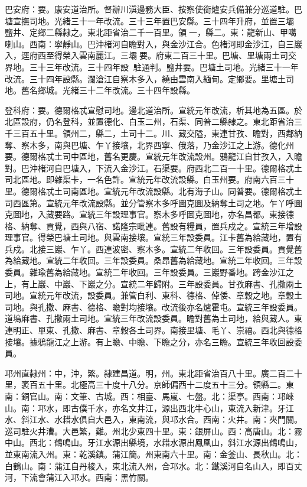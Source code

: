 \begin{pinyinscope}
巴安府：要。康安道治所。督辦川滇邊務大臣、按察使銜爐安兵備兼分巡道駐。巴塘宣撫司地。光緒三十一年改流。三十三年置巴安縣。三十四年升府，並置三壩，鹽井、定鄉二縣隸之。東北距省治二千一百里。領一，縣二。東：龍新山、甲噶喇山。西南：寧靜山。巴沖楮河自瞻對入，與金沙江合。色楮河即金沙江，自三巖入，逕府西至得榮入雲南麗江。三壩要。府東二百三十里。巴塘、里塘兩土司交界地。三十三年改流。三十四年設，駐通判。鹽井要。巴塘土司地。光緒三十一年改流。三十四年設縣。瀾滄江自察木多入，繞由雲南入緬甸。定鄉要。里塘土司地。舊名鄉城。光緒三十二年改流。三十四年設縣。

登科府：要。德爾格忒宣慰司地。邊北道治所。宣統元年改流，析其地為五區。於北區設府，仍名登科，並置德化、白玉二州，石渠、同普二縣隸之。東北距省治三千三百五十里。領州二，縣二，土司十二。川、藏交隘，東連甘孜、瞻對，西鄰納奪、察木多，南與巴塘、乍丫接壤，北界西寧、俄落，乃金沙江之上游。德化州要。德爾格忒土司中區地，舊名更慶。宣統元年改流設州。鴉龍江自甘孜入，入瞻對。巴沖楮河自巴塘入，下流入金沙江。石渠要。府西北二百一十里。德爾格忒土司北區地。即雜渠卡，一名色許。宣統元年改流設縣。白玉州要。府南六百三十里。德爾格忒土司南區地。宣統元年改流設縣。北有海子山。同普要。德爾格忒土司西區第。宣統元年改流設縣。並分管察木多呼圖克圖及納奪土司之地。乍丫呼圖克圖地，入藏要路。宣統三年設理事官。察木多呼圖克圖地，亦名昌都。東接德格、納奪、貢覺，西與八宿、諾隆宗毗連。舊設有糧員，置兵戍之。宣統三年增設理事官。得榮巴塘土司地。與雲南接壤。宣統三年設委員。江卡舊為給藏地，置有兵戍。北接三巖、乍丫。西連波密、察木多。宣統二年收回。三年設委員。貢覺舊為給藏地。宣統二年收回。三年設委員。桑昂舊為給藏地。宣統二年收回。三年設委員。雜瑜舊為給藏地。宣統二年收回。三年設委員。三巖野番地。跨金沙江之上，有上巖、中巖、下巖之分。宣統二年歸附。三年設委員。甘孜麻書、孔撒兩土司地。宣統元年改流，設委員。兼管白利、東科、德格、倬倭、章穀之地。章穀土司地。與孔撒、麻書、德格、瞻對均接壤。改流後亦名爐霍屯。宣統三年設委員。道塢麻書、孔撒兩土司地。宣統三年改流設委員。瞻對舊為土司地，給與藏人。東連明正、單東、孔撒、麻書、章穀各土司界。南接里塘、毛丫、崇禧。西北與德格接壤。據鴉龍江之上游。有上瞻、中瞻、下瞻之分，亦名三瞻。宣統三年收回設委員。

邛州直隸州：中，沖，繁。隸建昌道。明，州。東北距省治百八十里。廣二百二十里，袤百五十里。北極高三十度十八分。京師偏西十二度五十三分。領縣二。東南：銅官山。南：文筆、古城。西：相臺、馬嵐、七盤。北：渠亭。西南：邛崍山。南：邛水，即古僕千水，亦名文井江，源出西北牛心山，東流入新津。牙江水、斜江水、水耤水俱自大邑入，東南流，與邛水合。西南：火井。南：夾門關。巡司駐火井漕。大邑繁，難。州北少東四十里。東：銀屏山。西：高唐山。北：霧中山。西北：鶴鳴山。牙江水源出縣境，水耤水源出鳳凰山，斜江水源出鶴鳴山，並東南流入州。東：乾溪鎮。蒲江簡。州東南六十里。南：金釜山、長秋山。北：白鶴山。南：蒲江自丹棱入，東北流入州，合邛水。北：鐵溪河自名山入，即百丈河，下流會蒲江入邛水。西南：黑竹關。


\end{pinyinscope}
